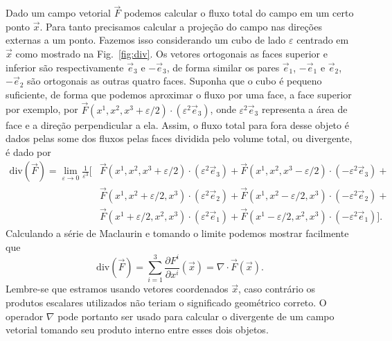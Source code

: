 Dado um campo vetorial $\vec{F}$ podemos calcular o fluxo total do campo em um
certo ponto $\vec{x}$. Para tanto precisamos calcular a projeção do campo nas
direções externas a um ponto. Fazemos isso considerando um cubo de lado
$\varepsilon$ centrado em $\vec{x}$ como mostrado na Fig.~\ref{fig:div}. Os
vetores ortogonais as faces superior e inferior são respectivamente $\vec{e}_3$
e $-\vec{e}_3$, de forma similar os pares $\vec{e}_1$, $-\vec{e}_1$ e $\vec{e}_2$,
$-\vec{e}_2$ são ortogonais as outras quatro faces. Suponha que o cubo é pequeno
suficiente, de forma que podemos aproximar o fluxo por uma face, a face superior
por exemplo, por $\vec{F}(x^1, x^2, x^3 + \varepsilon/2) \cdot
	\left(\varepsilon^2 \vec{e}_3\right)$, onde $\varepsilon^2\vec{e}_3$ representa
a área de face e a direção perpendicular a ela. Assim, o fluxo total para fora
desse objeto é dados pelas some dos fluxos pelas faces dividida pelo volume
total, ou divergente, é dado por
\begin{equation}\label{limdiv}
	\begin{split}
		\mathrm{div}(\vec{F}) = \lim_{\varepsilon\to0}\frac{1}{\varepsilon^3}\Big[ & \vec{F}(x^1,x^2,x^3+\varepsilon/2)\cdot\left(\varepsilon^2\vec{e}_3\right)+\vec{F}(x^1,x^2,x^3-\varepsilon/2)\cdot\left(-\varepsilon^2\vec{e}_3\right) +     \\
		                                                                           & \vec{F}(x^1,x^2+\varepsilon/2,x^3)\cdot\left(\varepsilon^2\vec{e}_2\right)+\vec{F}(x^1,x^2-\varepsilon/2,x^3)\cdot\left(-\varepsilon^2\vec{e}_2\right) +     \\
		                                                                           & \vec{F}(x^1+\varepsilon/2,x^2,x^3)\cdot\left(\varepsilon^2\vec{e}_1\right)+\vec{F}(x^1-\varepsilon/2,x^2,x^3)\cdot\left(-\varepsilon^2\vec{e}_1\right)\Big].
	\end{split}
\end{equation}
Calculando a série de Maclaurin e tomando o limite podemos mostrar facilmente que
\begin{equation}
	\mathrm{div}(\vec{F}) = \sum_{i=1}^3\frac{\partial F^i}{\partial x^i}(\vec{x}) = \nabla\cdot\vec{F}(\vec{x}).
\end{equation}
Lembre-se que estramos usando vetores coordenados $\vec{x}$, caso contrário os
produtos escalares utilizados não teriam o significado geométrico correto. O
operador $\nabla$ pode portanto ser usado para calcular o divergente de um campo
vetorial tomando seu produto interno entre esses dois objetos.

